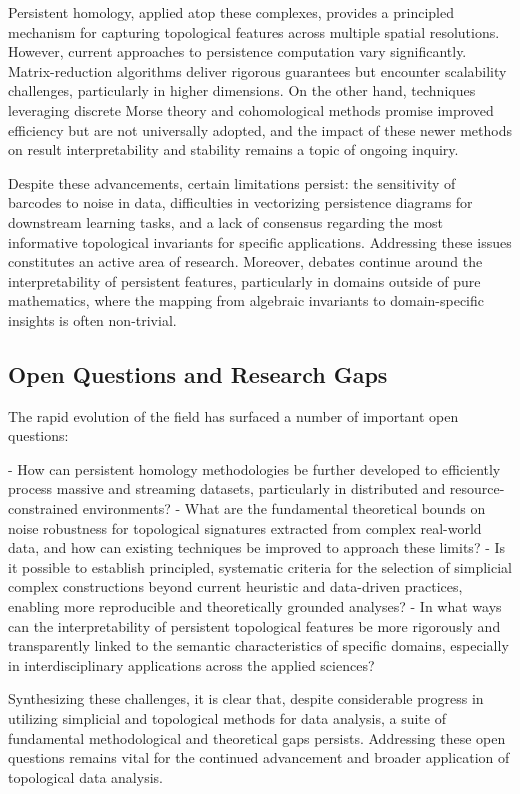 \documentclass[sigconf]{acmart}
\begin{document}
Persistent homology, applied atop these complexes, provides a principled mechanism for capturing topological features across multiple spatial resolutions. However, current approaches to persistence computation vary significantly. Matrix-reduction algorithms deliver rigorous guarantees but encounter scalability challenges, particularly in higher dimensions. On the other hand, techniques leveraging discrete Morse theory and cohomological methods promise improved efficiency but are not universally adopted, and the impact of these newer methods on result interpretability and stability remains a topic of ongoing inquiry.

Despite these advancements, certain limitations persist: the sensitivity of barcodes to noise in data, difficulties in vectorizing persistence diagrams for downstream learning tasks, and a lack of consensus regarding the most informative topological invariants for specific applications. Addressing these issues constitutes an active area of research. Moreover, debates continue around the interpretability of persistent features, particularly in domains outside of pure mathematics, where the mapping from algebraic invariants to domain-specific insights is often non-trivial.

\subsection{Open Questions and Research Gaps}

The rapid evolution of the field has surfaced a number of important open questions:

- How can persistent homology methodologies be further developed to efficiently process massive and streaming datasets, particularly in distributed and resource-constrained environments?
- What are the fundamental theoretical bounds on noise robustness for topological signatures extracted from complex real-world data, and how can existing techniques be improved to approach these limits?
- Is it possible to establish principled, systematic criteria for the selection of simplicial complex constructions beyond current heuristic and data-driven practices, enabling more reproducible and theoretically grounded analyses?
- In what ways can the interpretability of persistent topological features be more rigorously and transparently linked to the semantic characteristics of specific domains, especially in interdisciplinary applications across the applied sciences?

Synthesizing these challenges, it is clear that, despite considerable progress in utilizing simplicial and topological methods for data analysis, a suite of fundamental methodological and theoretical gaps persists. Addressing these open questions remains vital for the continued advancement and broader application of topological data analysis.
\end{document}
